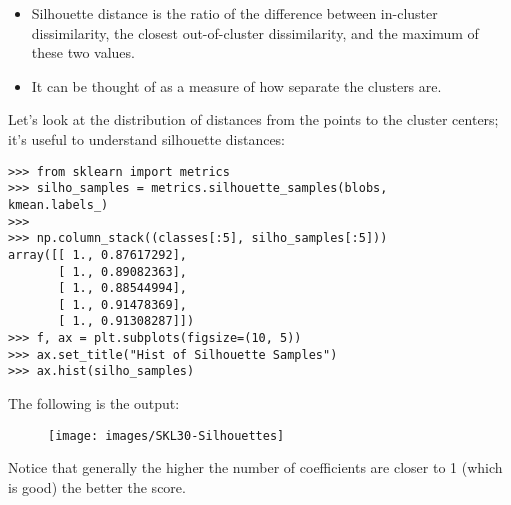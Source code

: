 \documentclass[SKL-MASTER.tex]{subfiles}
\begin{document}
\begin{framed}
\begin{itemize}
\item Silhouette distance is the ratio of the difference between in-cluster dissimilarity, the closest out-of-cluster dissimilarity, and the maximum of these two values. 
\item It can be thought of as a measure of how separate the clusters are.
\end{itemize}
\end{framed}

Let's look at the distribution of distances from the points to the cluster centers; it's useful
to understand silhouette distances:
\begin{framed}
\begin{verbatim}
>>> from sklearn import metrics
>>> silho_samples = metrics.silhouette_samples(blobs,
kmean.labels_)
>>>
>>> np.column_stack((classes[:5], silho_samples[:5]))
array([[ 1., 0.87617292],
       [ 1., 0.89082363],
       [ 1., 0.88544994],
       [ 1., 0.91478369],
       [ 1., 0.91308287]])
>>> f, ax = plt.subplots(figsize=(10, 5))
>>> ax.set_title("Hist of Silhouette Samples")
>>> ax.hist(silho_samples)
\end{verbatim}
\end{framed}

\noindent The following is the output:

\begin{figure}[h!]
\centering
\texttt{[image: images/SKL30-Silhouettes]}
\end{figure}

Notice that generally the higher the number of coefficients are closer to 1 (which is good)
the better the score.
\end{document}
